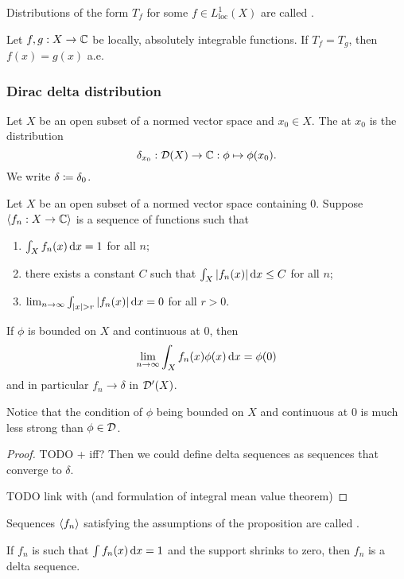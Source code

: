 \begin{definition}
Distributions of the form $T_f$ for some $f\in L^1_\text{loc}(X)$ are called .
\end{definition}


\begin{lemma} \label{uniquenessIntegratedFunction}
Let $f,g: X\to \mathbb{C}$ be locally, absolutely integrable functions. If $T_f = T_g$, then $f(x) = g(x)$ a.e.
\end{lemma}

\subsubsection{Dirac delta distribution}
\begin{definition}
    Let $X$ be an open subset of a normed vector space and $x_0\in X$. The  at $x_0$ is the distribution
    \[ \delta_{x_0}: \operatorname{\mathcal{D}}(X) \to \mathbb{C}: \phi \mapsto \phi(x_0). \]
    We write $\delta \coloneqq \delta_0$.
\end{definition}

\begin{proposition}
Let $X$ be an open subset of a normed vector space containing $0$. Suppose $\left\langle f_n: X\to \mathbb{C} \right\rangle$ is a sequence of functions such that
\begin{enumerate}
\item $\int_X f_n(x)\operatorname{d \!}{x} = 1$ for all $n$;
\item there exists a constant $C$ such that $\int_X |f_n(x)|\operatorname{d \!}{x} \leq C$ for all $n$;
\item $\lim_{n\to \infty} \int_{|x|>r}|f_n(x)|\diff{x} = 0 $ for all $r > 0$.
\end{enumerate}
If $\phi$ is bounded on $X$ and continuous at $0$, then
\[ \lim_{n\to \infty} \int_X f_n(x)\phi(x)\operatorname{d \!}{x} = \phi(0) \]
and in particular $f_n\to \delta$ in $\operatorname{\mathcal{D}^\prime}(X)$.
\end{proposition}
Notice that the condition of $\phi$ being bounded on $X$ and continuous at $0$ is much less strong than $\phi\in\operatorname{\mathcal{D}}$.
\begin{proof}
TODO + iff? Then we could define delta sequences as sequences that converge to $\delta$.

TODO link with (and formulation of integral mean value theorem)
\end{proof}
Sequences $\left\langle f_n \right\rangle$ satisfying the assumptions of the proposition are called .

\begin{lemma}
If $f_n$ is such that $\int f_n(x) \operatorname{d \!}{x} = 1$ and the support shrinks to zero, then $f_n$ is a delta sequence.
\end{lemma}

